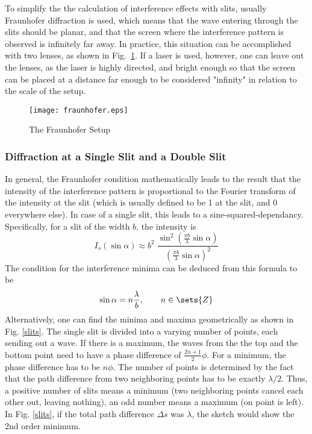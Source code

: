 \documentclass[a4paper,10pt]{article}
\begin{document}
To simplify the the calculation of interference effects with slits, usually Fraunhofer diffraction is used, which means that the wave entering through the slits should be planar, and that the screen where the interference pattern is observed is infinitely far away. In practice, this situation can be accomplished with two lenses, as shown in Fig.~\ref{fraunhofer}. If a laser is used, however, one can leave out the lenses, as the laser is highly directed, and bright enough so that the screen can be placed at a distance far enough to be considered "infinity" in relation to the scale of the setup.
\begin{figure}[htbp]
    \centering
    \texttt{[image: fraunhofer.eps]}
    \caption{The Fraunhofer Setup}
    \label{fraunhofer}
\end{figure}

\subsubsection*{Diffraction at a Single Slit and a Double Slit}
In general, the Fraunhofer condition mathematically leads to the result that the intensity of the interference pattern is proportional to the Fourier transform of the intensity at the slit (which is usually defined to be 1 at the slit, and 0 everywhere else). In case of a single slit, this leads to a sine-squared-dependancy. Specifically, for a slit of the width $b$, the intensity is
\begin{equation}
I_s(\sin \alpha) \approx b^2 \; \frac{\sin^2\left( \frac{\pi b}{\lambda} \sin \alpha \right)}{\left( \frac{\pi b}{\lambda} \sin \alpha \right)^2}
\end{equation}
The condition for the interference minima can be deduced from this formula to be
\begin{equation}
\sin \alpha = n \frac{\lambda}{b}, \qquad n \in \sets{Z}
\end{equation}
Alternatively, one can find the minima and maxima geometrically as shown in Fig. \ref{slits}. The single slit is divided into a varying number of points, each sending out a wave. If there is a maximum, the waves from the the top and the bottom point need to have a phase difference of $\frac{2n+1}{2}\phi$. For a minimum, the phase difference has to be $n\phi$. The number of points is determined by the fact that the path difference from two neighboring points has to be exactly $\lambda/2$. Thus, a positive number of slits means a minimum (two neighboring points cancel each other out, leaving nothing), an odd number means a maximum (on point is left). In Fig. \ref{slits}, if the total path difference $\Delta s$ was $\lambda$, the sketch would show the 2nd order minimum.
\end{document}
